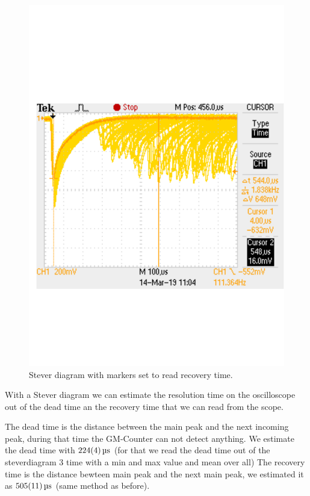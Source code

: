 \begin{figure}[H]
\centering
\includegraphics[width=\textwidth]{../Figures/F0001TEK.pdf}
\caption{Stever diagram with markers set to read recovery time.}
\label{fig:SteverRecovery}
\end{figure}

With a Stever diagram we can estimate the resolution time on the oscilloscope out of the dead time an the recovery time that we can read from the scope. 

The dead time is the distance between the main peak and the next incoming peak, during that time the GM-Counter can not detect anything.
We estimate the dead time with $\SI{224 \pm 4}{\micro s}$ (for that we read the dead time out of the steverdiagram 3 time with a min and max value and mean over all)
The recovery time is the distance bewteen main peak and the next main peak, we estimated it as $\SI{505\pm11}{\micro s}$ (same method as before).

